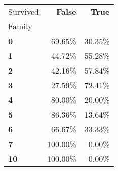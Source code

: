 \begin{tabular}{lrr}
\toprule
Survived & \textbf{False} & \textbf{True} \\
Family &  &  \\
\midrule
\textbf{0} & 69.65\% & 30.35\% \\
\textbf{1} & 44.72\% & 55.28\% \\
\textbf{2} & 42.16\% & 57.84\% \\
\textbf{3} & 27.59\% & 72.41\% \\
\textbf{4} & 80.00\% & 20.00\% \\
\textbf{5} & 86.36\% & 13.64\% \\
\textbf{6} & 66.67\% & 33.33\% \\
\textbf{7} & 100.00\% & 0.00\% \\
\textbf{10} & 100.00\% & 0.00\% \\
\bottomrule
\end{tabular}
